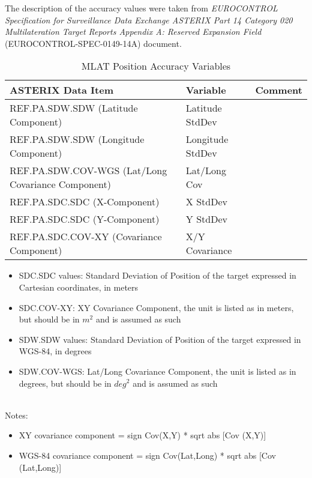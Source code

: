 The description of the accuracy values were taken from \textit{EUROCONTROL Specification for Surveillance Data Exchange ASTERIX Part 14 Category 020 Multilateration Target Reports Appendix A: Reserved Expansion Field} (EUROCONTROL-SPEC-0149-14A) document.

\begin{center}
 \begin{table}[H]
  \begin{tabularx}{\textwidth}{ | X | l | l | }
    \hline
    \textbf{ASTERIX Data Item} & \textbf{Variable} & \textbf{Comment} \\ \hline
     REF.PA.SDW.SDW (Latitude Component) & Latitude StdDev &  \\ \hline
     REF.PA.SDW.SDW (Longitude Component) & Longitude StdDev  &  \\ \hline
     REF.PA.SDW.COV-WGS (Lat/Long Covariance Component) & Lat/Long Cov  &  \\ \hline
     REF.PA.SDC.SDC (X-Component) & X StdDev &  \\ \hline
     REF.PA.SDC.SDC (Y-Component) & Y StdDev  &  \\ \hline
     REF.PA.SDC.COV-XY (Covariance Component) & X/Y Covariance  &  \\ \hline
\end{tabularx}
  \caption{MLAT Position Accuracy Variables}
\end{table}
\end{center}

\begin{itemize}
\item SDC.SDC values: Standard Deviation of Position of the target expressed in Cartesian coordinates, in meters
\item SDC.COV-XY: XY Covariance Component, the unit is listed as in meters, but should be in $m^2$ and is assumed as such
\item SDW.SDW values: Standard Deviation of Position of the target expressed in WGS-84, in degrees
\item SDW.COV-WGS: Lat/Long Covariance Component, the unit is listed as in degrees, but should be in $deg^2$ and is assumed as such
\end{itemize}
\ \\

Notes:
\begin{itemize}
\item XY covariance component = sign {Cov(X,Y)} * sqrt {abs [Cov (X,Y)]}
\item WGS-84 covariance component = sign {Cov(Lat,Long)} * sqrt {abs [Cov (Lat,Long)]}
\end{itemize}

